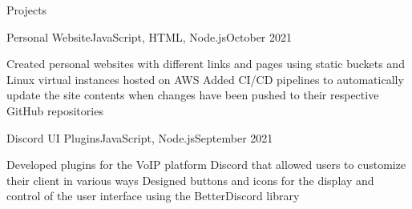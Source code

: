 \documentclass[11pt,fit=false]{cv_template}
\begin{document}
\begin{cv}
\begin{cvsection}{Projects}
\begin{cvsubsection}
{Personal Website}{JavaScript, HTML, Node.js}{October 2021}{}

\listitem Created personal websites with different links and pages using static buckets and Linux virtual instances hosted on AWS
\listitem Added CI/CD pipelines to automatically update the site contents when changes have been pushed to their respective GitHub repositories

\end{cvsubsection}


\begin{cvsubsection}
{Discord UI Plugins}{JavaScript, Node.js}{September 2021}{}

\listitem Developed plugins for the VoIP platform Discord that allowed users to customize their client in various ways
\listitem Designed buttons and icons for the display and control of the user interface using the BetterDiscord library

\end{cvsubsection}









\end{cvsection}
\end{cv}
\end{document}
